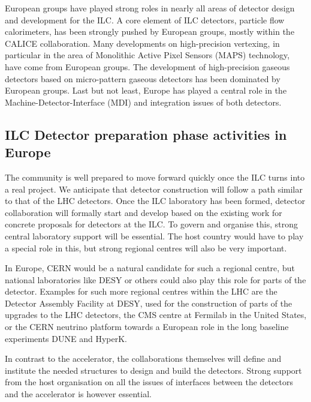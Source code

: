 \documentclass[%
 reprint,
 floatfix,
 amsmath,amssymb,
 aps,
]{revtex4-1}
\begin{document}
European groups have played strong roles in nearly all areas of detector design 
and development for the ILC. A core element of ILC detectors, particle flow 
calorimeters, has been strongly pushed by European groups, mostly within the CALICE collaboration. Many developments on 
high-precision vertexing, in particular in the area of Monolithic Active Pixel 
Sensors (MAPS) technology, have come from European groups. The development of 
high-precision gaseous detectors based on micro-pattern gaseous detectors has 
been dominated by European groups. Last but not least, Europe has played a 
central role in the Machine-Detector-Interface (MDI) and integration issues of 
both detectors.

\subsection{ILC Detector preparation phase activities in Europe~\label{sec:det:prepphase}}
The community is well prepared to move forward quickly once the ILC turns into a 
real project. We anticipate that detector construction will follow a path 
similar to that of the LHC detectors. Once the ILC laboratory has been formed, 
detector collaboration will formally start and develop based on the existing 
work for concrete proposals for detectors at the ILC. To govern and organise this,  
strong central laboratory support will be essential. The host country would have 
to play a special role in this, but strong regional centres will also be very 
important. 

In Europe, CERN would be a natural candidate for such a regional 
centre, but national laboratories like DESY or others could also play this role 
for parts of the detector. Examples for such more regional centres within the 
LHC are the Detector Assembly Facility at DESY, used for the construction of 
parts of the upgrades to the LHC detectors, the CMS centre at Fermilab in the 
United States, or the CERN neutrino platform towards a European role in the long 
baseline experiments DUNE and HyperK. 

In contrast to the accelerator, the collaborations themselves will define and institute 
the needed structures to design and build the detectors. Strong support from the host 
organisation on all the issues of interfaces between the detectors and the accelerator is however essential. 
\end{document}
